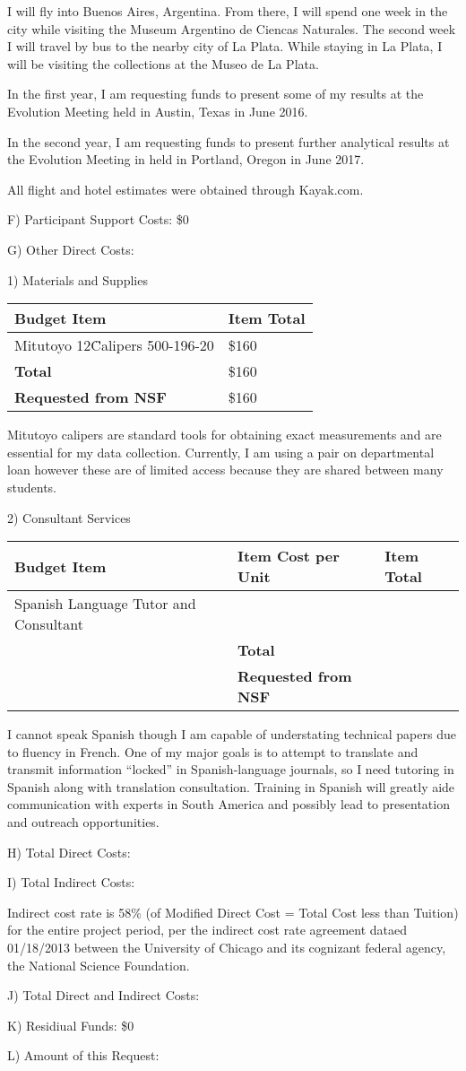 \documentclass[11pt,letterpaper]{article}
\begin{document}
I will fly into Buenos Aires, Argentina. From there, I will spend one week in the city while visiting the Museum Argentino de Ciencas Naturales. The second week I will travel by bus to the nearby city of La Plata. While staying in La Plata, I will be visiting the collections at the Museo de La Plata. 

In the first year, I am requesting funds to present some of my results at the Evolution Meeting held in Austin, Texas in June 2016.

In the second year, I am requesting funds to present further analytical results at the Evolution Meeting in held in Portland, Oregon in June 2017.

All flight and hotel estimates were obtained through Kayak.com.


F) Participant Support Costs: \$0

G) Other Direct Costs:

1) Materials and Supplies

\begin{tabular}[H]{l l}
  Budget Item & Item Total \\
  \hline
  Mitutoyo 12\" Calipers 500-196-20 & \$160 \\
  \textbf{Total} & \$160 \\
  \textbf{Requested from NSF} & \$160
\end{tabular}

Mitutoyo calipers are standard tools for obtaining exact measurements and are essential for my data collection. Currently, I am using a pair on departmental loan however these are of limited access because they are shared between many students. 


2) Consultant Services

\begin{tabular}[H]{l l l}
  Budget Item & Item Cost per Unit & Item Total \\
  \hline
  Spanish Language Tutor and Consultant & \\
  & \textbf{Total} & \\
  & \textbf{Requested from NSF} & 
\end{tabular}

I cannot speak Spanish though I am capable of understating technical papers due to fluency in French. One of my major goals is to attempt to translate and transmit information ``locked'' in Spanish-language journals, so I need tutoring in Spanish along with translation consultation. Training in Spanish will greatly aide communication with experts in South America and possibly lead to presentation and outreach opportunities.


H) Total Direct Costs:

I) Total Indirect Costs:

Indirect cost rate is 58\% (of Modified Direct Cost = Total Cost less than Tuition) for the entire project period, per the indirect cost rate agreement dataed 01/18/2013 between the University of Chicago and its cognizant federal agency, the National Science Foundation.


J) Total Direct and Indirect Costs:

K) Residiual Funds: \$0

L) Amount of this Request:
\end{document}
